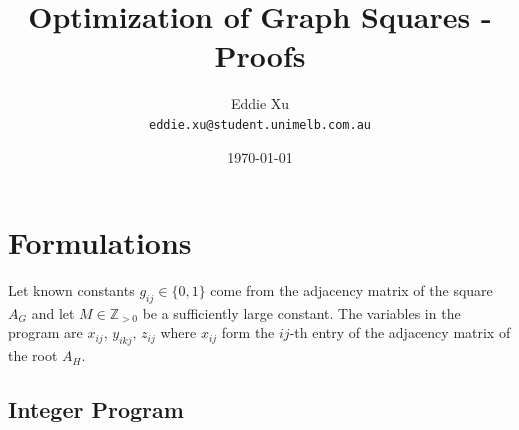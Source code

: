 \documentclass[11pt]{article}
\title{Optimization of Graph Squares - Proofs}
\author{Eddie Xu\\\small\texttt{eddie.xu@student.unimelb.com.au}}
\date{\today}
\begin{document}
\maketitle

\tableofcontents

\section{Formulations} \label{sec::formulations}

Let known constants $g_{ij} \in \{0, 1\}$ come from the adjacency matrix of the square $A_G$ and let $M \in \mathbb{Z}_{> 0}$ be a sufficiently large constant. The variables in the program are $x_{ij}$, $y_{ikj}$, $z_{ij}$ where $x_{ij}$ form the $ij$-th entry of the adjacency matrix of the root $A_H$.  

\subsection{Integer Program} \label{subsec::integer_program}
\end{document}
